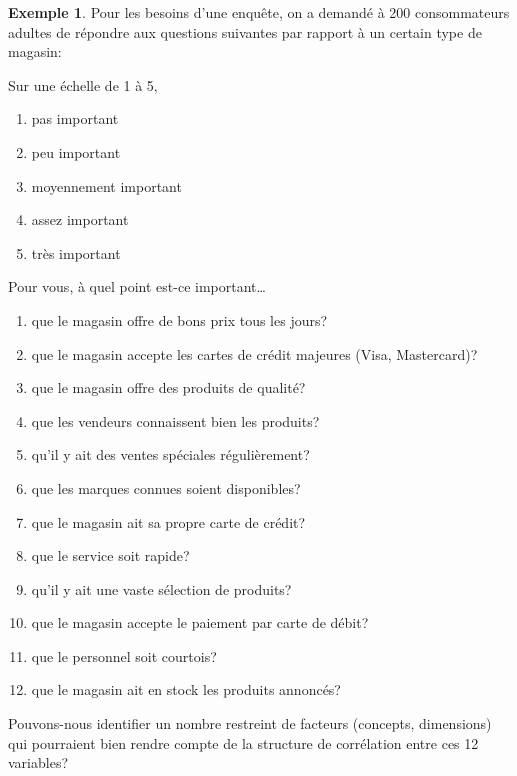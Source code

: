 \documentclass[
  11pt,
  letterpaper,
]{book}
\providecommand{\tightlist}{%
  \setlength{\itemsep}{0pt}\setlength{\parskip}{0pt}}
\theoremstyle{definition}
\theoremstyle{definition}
\newtheorem{example}{Exemple}[chapter]
\theoremstyle{definition}
\theoremstyle{definition}
\theoremstyle{remark}
\begin{document}
\begin{example}
\protect\hypertarget{exm:unnamed-chunk-1}{}{\label{exm:unnamed-chunk-1} }Pour les besoins d'une enquête, on a demandé à 200 consommateurs adultes de répondre aux questions suivantes par rapport à un certain type de magasin:

Sur une échelle de 1 à 5,

\begin{enumerate}
\def\labelenumi{\arabic{enumi}.}
\tightlist
\item
  pas important
\item
  peu important
\item
  moyennement important
\item
  assez important
\item
  très important
\end{enumerate}

Pour vous, à quel point est-ce important\ldots

\begin{enumerate}
\def\labelenumi{\arabic{enumi}.}
\tightlist
\item
  que le magasin offre de bons prix tous les jours?
\item
  que le magasin accepte les cartes de crédit majeures (Visa, Mastercard)?
\item
  que le magasin offre des produits de qualité?
\item
  que les vendeurs connaissent bien les produits?
\item
  qu'il y ait des ventes spéciales régulièrement?
\item
  que les marques connues soient disponibles?
\item
  que le magasin ait sa propre carte de crédit?
\item
  que le service soit rapide?
\item
  qu'il y ait une vaste sélection de produits?
\item
  que le magasin accepte le paiement par carte de débit?
\item
  que le personnel soit courtois?
\item
  que le magasin ait en stock les produits annoncés?
\end{enumerate}

Pouvons-nous identifier un nombre restreint de facteurs (concepts, dimensions) qui pourraient bien rendre compte de la structure de corrélation entre ces 12 variables?
\end{example}
\end{document}
